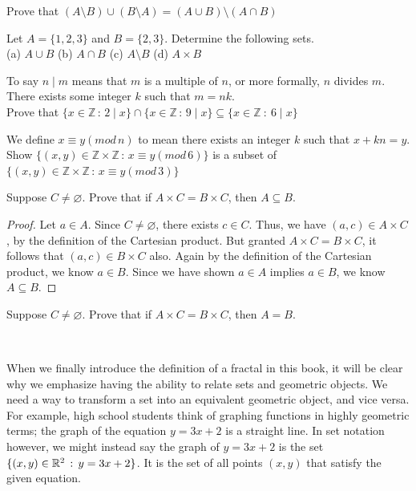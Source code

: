 \begin{exercise}
    Prove that $(A\setminus B) \cup (B\setminus A) = (A\cup B) \setminus (A\cap B)$
\end{exercise}
    \vspace{-4mm}
\begin{exercise}
  Let $A = \{1, 2, 3\}$ and $B = \{2, 3\}$.
  Determine the following sets. \\
  (a) $A \cup B$ \quad
  (b) $A \cap B$ \quad
  (c) $A \setminus B$ \quad
  (d) $A \times B$
\end{exercise}
    \vspace{-4mm}
\begin{exercise}
    To say $n\mid m$ means that $m$ is a multiple of $n$, or more formally, $n$ divides $m$. There exists some integer $k$ such that $m=nk$.\\ 
    Prove that $\{x\in\mathbb{Z}\, : \, 2\mid x\}\cap \{x\in\mathbb{Z}\, : \, 9\mid x\}\subseteq \{x\in\mathbb{Z}\ : \ 6\mid x\}$
\end{exercise}
    \vspace{-4mm}
\begin{exercise}
    We define $x\equiv y (mod\, n)$ to mean there exists an integer $k$ such that $x+kn=y$. Show $\{(x,y)\in\mathbb{Z}\times\mathbb{Z}\, : \, x\equiv y (mod\, 6)\}$ is a subset of $\{(x,y)\in\mathbb{Z}\times\mathbb{Z}\, : \, x\equiv y (mod\, 3)\}$
\end{exercise}

\begin{example}
    Suppose $C\neq\varnothing$. Prove that if $A\times C = B\times C$, then $A\subseteq B$. \\
    \begin{proof}
        Let $a\in A$. Since $C\neq\varnothing$, there exists $c\in C$. Thus, we have $(a,c)\in A\times C$, by the definition of the Cartesian product. But granted $A\times C=B\times C$, it follows that $(a,c)\in B\times C$ also. Again by the definition of the Cartesian product, we know $a\in B$. Since we have shown $a\in A$ implies $a\in B$, we know $A\subseteq B$. 
    \end{proof}
\end{example}

\begin{exercise}
    Suppose $C\neq\varnothing$. Prove that if $A\times C = B\times C$, then $A=B$. 
\end{exercise}
\

When we finally introduce the definition of a fractal in this book, it will be clear why we emphasize having the ability to relate sets and geometric objects. We need a way to transform a set into an equivalent geometric object, and vice versa. For example, high school students think of graphing functions in highly geometric terms; the graph of the equation $y=3x+2$ is a straight line. In set notation however, we might instead say the graph of $y=3x+2$ is the set $\{(x,y)\in\mathbb{R}^2\,:\,y=3x+2\}$. It is the set of all points $(x,y)$ that satisfy the given equation. \\

